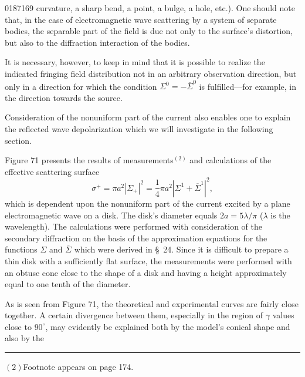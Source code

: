 \begin{scanpage}{0187}{169}
curvature, a sharp bend, a point, a bulge, a hole, etc.). One should note that, in the case of electromagnetic wave scattering by a system of separate bodies, the separable part of the field is due not only to the surface's distortion, but also to the diffraction interaction of the bodies.

It is necessary, however, to keep in mind that it is possible to realize the indicated fringing field distribution not in an arbitrary observation direction, but only in a direction for which the condition $\Sigma^0=-\overline\Sigma^0$ is fulfilled---for example, in the direction towards the source.

Consideration of the nonuniform part of the current also enables one to explain the reflected wave depolarization which we will investigate in the following section.

Figure 71 presents the results of measurements$^{(2)}$ and calculations of the effective scattering surface
\[
\sigma^+=\pi a^2|\Sigma_+|^2=\frac14\pi a^2|\Sigma^1+\overline\Sigma^1|^2,\tag{26.19}
\]
which is dependent upon the nonuniform part of the current excited by a plane electromagnetic wave on a disk. The disk's diameter equals $2a=5\lambda/\pi$ ($\lambda$ is the wavelength). The calculations were performed with consideration of the secondary diffraction on the basis of the approximation equations for the functions $\Sigma$ and $\overline\Sigma$ which were derived in \S~24. Since it is difficult to prepare a thin disk with a sufficiently flat surface, the measurements were performed with an obtuse cone close to the shape of a disk and having a height approximately equal to one tenth of the diameter.

As is seen from Figure 71, the theoretical and experimental curves are fairly close together. A certain divergence between them, especially in the region of $\gamma$ values close to $90^\circ$, may evidently be explained both by the model's conical shape and also by the
\par\bigskip\hrule\smallskip
$(2)$Footnote appears on page 174.
\end{scanpage}
